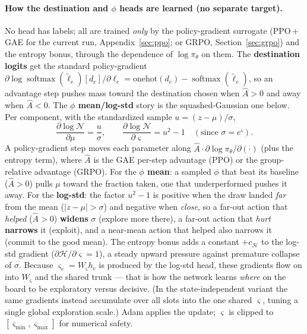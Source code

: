 \documentclass[11pt]{article}
\newcommand{\softmax}{\operatorname{softmax}}
\newcommand{\Adv}{\hat{A}}
\newcommand{\pol}{\pi_\theta}
\begin{document}
\paragraph{How the destination and $\phi$ heads are learned (no separate target).} No head has
labels; all are trained \emph{only} by the policy-gradient surrogate (PPO\,+\,GAE for the current run,
Appendix~\ref{sec:ppo}; or GRPO, Section~\ref{sec:grpo}) and the entropy bonus, through the dependence
of $\log\pol$ on them. The \textbf{destination logits} get the standard policy-gradient
$\partial\log\softmax(\tilde\ell_e)[d_e]/\partial\ell_e=\mathrm{onehot}(d_e)-\softmax(\tilde\ell_e)$, so
an advantage step pushes mass toward the destination chosen when $\Adv>0$ and away when $\Adv<0$. The
\textbf{$\phi$ mean/log-std} story is the squashed-Gaussian one below. Per component, with the
standardized sample $u=(z-\mu)/\sigma$,
\begin{equation}
\frac{\partial \log\mathcal N}{\partial \mu}=\frac{u}{\sigma},
\qquad
\frac{\partial \log\mathcal N}{\partial \varsigma}=u^2-1
\quad(\text{since }\sigma=e^{\varsigma}).
\end{equation}
A policy-gradient step moves each parameter along $\Adv\cdot\partial\log\pol/\partial(\cdot)$ (plus
the entropy term), where $\Adv$ is the GAE per-step advantage (PPO) or the group-relative advantage
(GRPO). For the \textbf{$\phi$ mean}: a sampled $\phi$ that beat its baseline ($\Adv>0$)
pulls $\mu$ toward the fraction taken, one that underperformed pushes it away. For the
\textbf{log-std}: the factor $u^2-1$ is positive when the draw landed \emph{far} from the mean
($|z-\mu|>\sigma$) and negative when \emph{close}, so a far-out action that \emph{helped} ($\Adv>0$)
\textbf{widens} $\sigma$ (explore more there), a far-out action that \emph{hurt} \textbf{narrows} it
(exploit), and a near-mean action that helped also narrows it (commit to the good mean). The entropy
bonus adds a constant $+c_{\mathcal H}$ to the log-std gradient ($\partial\mathcal H/\partial\varsigma=1$),
a steady upward pressure against premature collapse of $\sigma$. Because $\varsigma_e=W_\varsigma h_e$
is produced by the log-std head, these gradients flow on into $W_\varsigma$ and the shared trunk ---
that is how the network learns \emph{where} on the board to be exploratory versus decisive. (In the
state-independent variant the same gradients instead accumulate over all slots into the one shared
$\varsigma$, tuning a single global exploration scale.) Adam applies the update; $\varsigma$ is
clipped to $[\varsigma_{\min},\varsigma_{\max}]$ for numerical safety.
\end{document}
